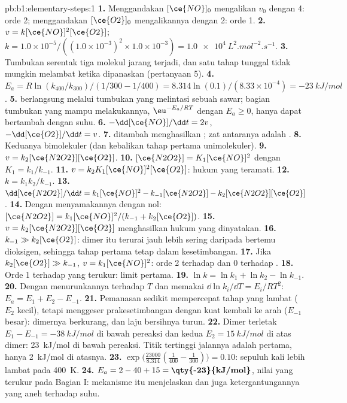 \begin{solution}{pb:b1:elementary-steps:1}
\textbf{1.} Menggandakan $[\ce{NO}]_0$ mengalikan $v_0$ dengan 4: orde 2;
menggandakan $[\ce{O2}]_0$ mengalikannya dengan 2: orde 1.
\textbf{2.} $v = k[\ce{NO}]^2[\ce{O2}]$; $k = 1.0 \times 10^{-5}/((1.0
\times 10^{-3})^2 \times 1.0 \times 10^{-3}) =
\qty{1.0e4}{L^2.mol^{-2}.s^{-1}}$.
\textbf{3.} Tumbukan serentak tiga molekul jarang terjadi, dan satu tahap
tunggal tidak mungkin melambat ketika dipanaskan (pertanyaan 5).
\textbf{4.} $E_a = R\ln(k_{400}/k_{300})/(1/300 - 1/400) = 8.314 \ln(0.1)
/(8.33 \times 10^{-4}) = \qty{-23}{kJ/mol}$.
\textbf{5.}  berlangsung melalui tumbukan yang melintasi
sebuah sawar; bagian tumbukan yang mampu melakukannya,
$\eu^{-E_a/RT}$ dengan $E_a \ge
0$, hanya dapat bertambah dengan suhu.
\textbf{6.} $-\dd[\ce{NO}]/\dd t = 2v$, $-\dd[\ce{O2}]/\dd t = v$.
\textbf{7.}  ditambah  menghasilkan
; zat antaranya adalah .
\textbf{8.} Keduanya bimolekuler (dan kebalikan tahap pertama
unimolekuler).
\textbf{9.} $v = k_2[\ce{N2O2}][\ce{O2}]$.
\textbf{10.} $[\ce{N2O2}] = K_1[\ce{NO}]^2$ dengan $K_1 = k_1/k_{-1}$.
\textbf{11.} $v = k_2K_1[\ce{NO}]^2[\ce{O2}]$: hukum yang teramati.
\textbf{12.} $k = k_1k_2/k_{-1}$.
\textbf{13.} $\dd[\ce{N2O2}]/\dd t = k_1[\ce{NO}]^2 - k_{-1}[\ce{N2O2}] -
k_2[\ce{N2O2}][\ce{O2}]$.
\textbf{14.} Dengan menyamakannya dengan nol: $[\ce{N2O2}] = k_1[\ce{NO}]^2/(k_{-1} +
k_2[\ce{O2}])$.
\textbf{15.} $v = k_2[\ce{N2O2}][\ce{O2}]$ menghasilkan hukum yang
dinyatakan.
\textbf{16.} $k_{-1} \gg k_2[\ce{O2}]$: dimer itu terurai jauh lebih
sering daripada bertemu dioksigen, sehingga tahap pertama tetap dalam
kesetimbangan.
\textbf{17.} Jika $k_2[\ce{O2}] \gg k_{-1}$, $v = k_1[\ce{NO}]^2$: orde 2
terhadap  dan 0 terhadap .
\textbf{18.} Orde 1 terhadap  yang terukur: limit pertama.
\textbf{19.} $\ln k = \ln k_1 + \ln k_2 - \ln k_{-1}$.
\textbf{20.} Dengan menurunkannya terhadap $T$ dan memakai $\dd\ln k_i/\dd T
= E_i/RT^2$: $E_a = E_1 + E_2 - E_{-1}$.
\textbf{21.} Pemanasan sedikit mempercepat tahap yang lambat ($E_2$ kecil),
tetapi menggeser prakesetimbangan dengan kuat kembali ke arah 
($E_{-1}$ besar): dimernya berkurang, dan laju bersihnya turun.
\textbf{22.} Dimer terletak $E_1 - E_{-1} = \qty{-38}{kJ/mol}$ di bawah
pereaksi dan  kedua $E_2 = \qty{15}{kJ/mol}$ di atas
dimer: \qty{23}{kJ/mol} di bawah pereaksi. Titik tertinggi jalannya
adalah  pertama, hanya \qty{2}{kJ/mol} di atasnya.
\textbf{23.} $\exp\big(\frac{23000}{8.314}(\frac{1}{400} - \frac{1}{300})\big)
= 0.10$: sepuluh kali lebih lambat pada \qty{400}{K}.
\textbf{24.} $E_a = 2 - 40 + 15 = \textbf{\qty{-23}{kJ/mol}}$, nilai yang
terukur pada Bagian I: mekanisme itu menjelaskan  dan juga
ketergantungannya yang aneh terhadap suhu.
\end{solution}

